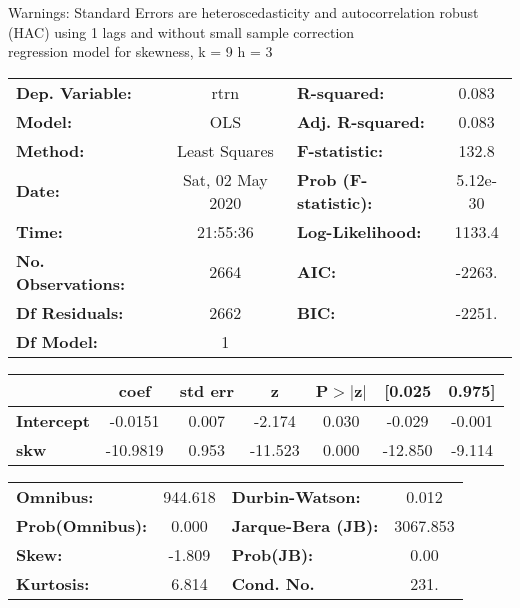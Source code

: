 Warnings: \newline
 [1] Standard Errors are heteroscedasticity and autocorrelation robust (HAC) using 1 lags and without small sample correction\\ 

regression model for skewness, k = 9 h = 3\begin{center}
\begin{tabular}{lclc}
\toprule
\textbf{Dep. Variable:}    &       rtrn       & \textbf{  R-squared:         } &     0.083   \\
\textbf{Model:}            &       OLS        & \textbf{  Adj. R-squared:    } &     0.083   \\
\textbf{Method:}           &  Least Squares   & \textbf{  F-statistic:       } &     132.8   \\
\textbf{Date:}             & Sat, 02 May 2020 & \textbf{  Prob (F-statistic):} &  5.12e-30   \\
\textbf{Time:}             &     21:55:36     & \textbf{  Log-Likelihood:    } &    1133.4   \\
\textbf{No. Observations:} &        2664      & \textbf{  AIC:               } &    -2263.   \\
\textbf{Df Residuals:}     &        2662      & \textbf{  BIC:               } &    -2251.   \\
\textbf{Df Model:}         &           1      & \textbf{                     } &             \\
\bottomrule
\end{tabular}
\begin{tabular}{lcccccc}
                   & \textbf{coef} & \textbf{std err} & \textbf{z} & \textbf{P$> |$z$|$} & \textbf{[0.025} & \textbf{0.975]}  \\
\midrule
\textbf{Intercept} &      -0.0151  &        0.007     &    -2.174  &         0.030        &       -0.029    &       -0.001     \\
\textbf{skw}       &     -10.9819  &        0.953     &   -11.523  &         0.000        &      -12.850    &       -9.114     \\
\bottomrule
\end{tabular}
\begin{tabular}{lclc}
\textbf{Omnibus:}       & 944.618 & \textbf{  Durbin-Watson:     } &    0.012  \\
\textbf{Prob(Omnibus):} &   0.000 & \textbf{  Jarque-Bera (JB):  } & 3067.853  \\
\textbf{Skew:}          &  -1.809 & \textbf{  Prob(JB):          } &     0.00  \\
\textbf{Kurtosis:}      &   6.814 & \textbf{  Cond. No.          } &     231.  \\
\bottomrule
\end{tabular}
\end{center}

